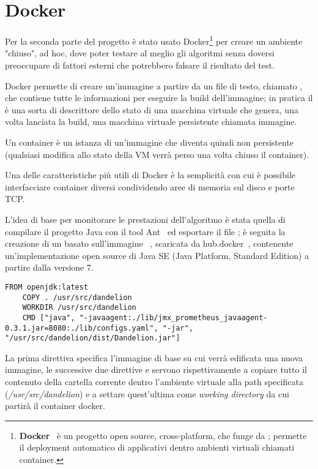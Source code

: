 \section{Docker}
Per la seconda parte del progetto è stato usato Docker\footnote{
    \textbf{Docker}~\cite{docker} è un progetto open source, cross-platform, che funge da ; 
    permette il deployment automatico di applicativi dentro ambienti virtuali chiamati container.
} per creare un ambiente "chiuso", ad hoc, dove poter testare al meglio gli algoritmi senza doversi preoccupare di fattori esterni che potrebbero falsare 
il risultato del test. 

Docker permette di creare un'immagine a partire da un file di testo, chiamato , che contiene tutte le informazioni per eseguire la build dell'immagine; 
in pratica il  è una sorta di descrittore dello stato di una macchina virtuale che genera, una volta lanciata la build, una macchina virtuale persistente chiamata immagine. 

Un container è un istanza di un'immagine che diventa quindi non persistente (qualsiasi modifica allo stato della VM verrà perso una volta chiuso il container). 

Una delle caratteristiche più utili di Docker è la semplicità con cui è possibile interfacciare container diversi condividendo aree di memoria sul disco e porte TCP.

L'idea di base per monitorare le prestazioni dell'algoritmo è stata quella di compilare il progetto Java con il tool Ant~\cite{ant} ed esportare il file ; 
è seguita la creazione di un  basato sull'immagine ~\cite{open-jdk}, 
scaricata da hub.docker~\cite{hub-docker}, contenente un'implementazione open source di Java SE (Java Platform, Standard Edition) a partire dalla versione 7. 

\begin{lstlisting}[style=YmlStyle, caption=Dockerfile]
    FROM openjdk:latest
    COPY . /usr/src/dandelion
    WORKDIR /usr/src/dandelion
    CMD ["java", "-javaagent:./lib/jmx_prometheus_javaagent-0.3.1.jar=8080:./lib/configs.yaml", "-jar", "/usr/src/dandelion/dist/Dandelion.jar"]
\end{lstlisting}

La prima direttiva  specifica l'immagine di base su cui verrà edificata una nuova immagine, le successive due direttive  e  servono rispettivamente a copiare 
tutto il contenuto della cartella corrente dentro l'ambiente virtuale alla path specificata (\textit{/usr/src/dandelion}) e a settare quest'ultima come \textit{working directory} da cui 
partirà il container docker. 

